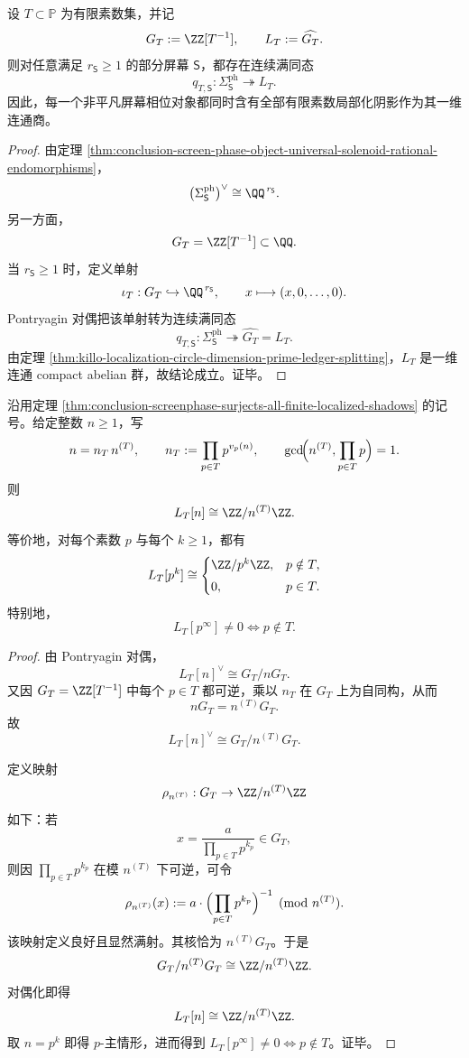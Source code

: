 \begin{theorem}[任意非平凡屏幕相位对象都满射到全部有限素数局部化阴影]\label{thm:conclusion-screenphase-surjects-all-finite-localized-shadows}
设 \(T\subset \mathbb P\) 为有限素数集，并记
\[
G_T:=\ZZ[T^{-1}],
\qquad
L_T:=\widehat{G_T}.
\]
则对任意满足 \(r_{\mathsf S}\ge 1\) 的部分屏幕 \(\mathsf S\)，都存在连续满同态
\[
q_{T,\mathsf S}:\Sigma_{\mathsf S}^{\mathrm{ph}}\twoheadrightarrow L_T.
\]
因此，每一个非平凡屏幕相位对象都同时含有全部有限素数局部化阴影作为其一维连通商。
\end{theorem}
\begin{proof}
由定理 \ref{thm:conclusion-screen-phase-object-universal-solenoid-rational-endomorphisms}，
\[
\bigl(\Sigma_{\mathsf S}^{\mathrm{ph}}\bigr)^\vee\cong \QQ^{\,r_{\mathsf S}}.
\]
另一方面，
\[
G_T=\ZZ[T^{-1}]\subset \QQ.
\]
当 \(r_{\mathsf S}\ge 1\) 时，定义单射
\[
\iota_T:G_T\hookrightarrow \QQ^{\,r_{\mathsf S}},
\qquad
x\longmapsto (x,0,\dots,0).
\]
Pontryagin 对偶把该单射转为连续满同态
\[
q_{T,\mathsf S}:\Sigma_{\mathsf S}^{\mathrm{ph}}\twoheadrightarrow \widehat{G_T}=L_T.
\]
由定理 \ref{thm:killo-localization-circle-dimension-prime-ledger-splitting}，\(L_T\) 是一维连通 compact abelian 群，故结论成立。证毕。
\end{proof}

\begin{theorem}[有限素数局部化阴影的精确有限挠谱]\label{thm:conclusion-finite-localized-shadow-exact-torsion-spectrum}
沿用定理 \ref{thm:conclusion-screenphase-surjects-all-finite-localized-shadows} 的记号。给定整数 \(n\ge 1\)，写
\[
n=n_T\,n^{(T)},
\qquad
n_T:=\prod_{p\in T}p^{v_p(n)},
\qquad
\gcd\!\Bigl(n^{(T)},\prod_{p\in T}p\Bigr)=1.
\]
则
\[
L_T[n]\cong \ZZ/n^{(T)}\ZZ.
\]
等价地，对每个素数 \(p\) 与每个 \(k\ge 1\)，都有
\[
L_T[p^k]\cong
\begin{cases}
\ZZ/p^k\ZZ,& p\notin T,\\[1mm]
0,& p\in T.
\end{cases}
\]
特别地，
\[
L_T[p^\infty]\neq 0\iff p\notin T.
\]
\end{theorem}
\begin{proof}
由 Pontryagin 对偶，
\[
L_T[n]^\vee \cong G_T/nG_T.
\]
又因 \(G_T=\ZZ[T^{-1}]\) 中每个 \(p\in T\) 都可逆，乘以 \(n_T\) 在 \(G_T\) 上为自同构，从而
\[
nG_T=n^{(T)}G_T.
\]
故
\[
L_T[n]^\vee\cong G_T/n^{(T)}G_T.
\]

定义映射
\[
\rho_{n^{(T)}}:G_T\to \ZZ/n^{(T)}\ZZ
\]
如下：若
\[
x=\frac{a}{\prod_{p\in T}p^{k_p}}\in G_T,
\]
则因 \(\prod_{p\in T}p^{k_p}\) 在模 \(n^{(T)}\) 下可逆，可令
\[
\rho_{n^{(T)}}(x):=
a\cdot \Bigl(\prod_{p\in T}p^{k_p}\Bigr)^{-1}\pmod{n^{(T)}}.
\]
该映射定义良好且显然满射。其核恰为 \(n^{(T)}G_T\)。于是
\[
G_T/n^{(T)}G_T\cong \ZZ/n^{(T)}\ZZ.
\]
对偶化即得
\[
L_T[n]\cong \ZZ/n^{(T)}\ZZ.
\]
取 \(n=p^k\) 即得 \(p\)-主情形，进而得到 \(L_T[p^\infty]\neq 0\iff p\notin T\)。证毕。
\end{proof}

